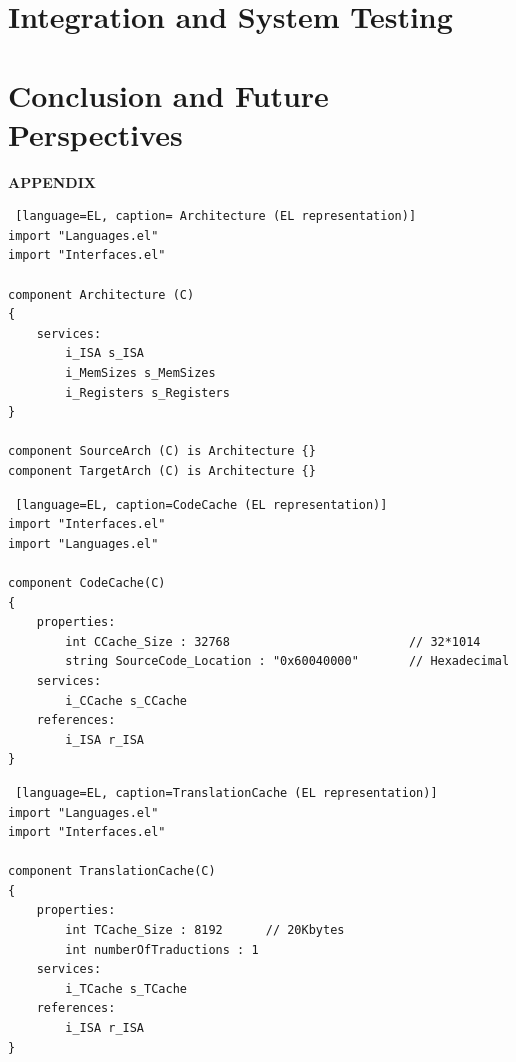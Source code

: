 \documentclass[12pt]{article}
\begin{document}
\section{Integration and System Testing}


\newpage
\section{Conclusion and Future Perspectives}


\newpage



\newpage
\begin{appendices}
\huge \textbf{APPENDIX}
\end{appendices}


\begin{lstlisting} [language=EL, caption= Architecture (EL representation)]
import "Languages.el"
import "Interfaces.el"

component Architecture (C)
{
	services:
		i_ISA s_ISA
		i_MemSizes s_MemSizes
		i_Registers s_Registers
}

component SourceArch (C) is Architecture {}
component TargetArch (C) is Architecture {}
\end{lstlisting}


\begin{lstlisting} [language=EL, caption=CodeCache (EL representation)]
import "Interfaces.el"
import "Languages.el"

component CodeCache(C)
{
	properties:
		int CCache_Size : 32768							// 32*1014
		string SourceCode_Location : "0x60040000"		// Hexadecimal
	services:
		i_CCache s_CCache
	references:
		i_ISA r_ISA
}
\end{lstlisting}


\begin{lstlisting} [language=EL, caption=TranslationCache (EL representation)]
import "Languages.el"
import "Interfaces.el"

component TranslationCache(C)
{
	properties:
		int TCache_Size : 8192 		// 20Kbytes
		int numberOfTraductions : 1	
	services:
		i_TCache s_TCache
	references:
		i_ISA r_ISA	
}
\end{lstlisting}
\end{document}
